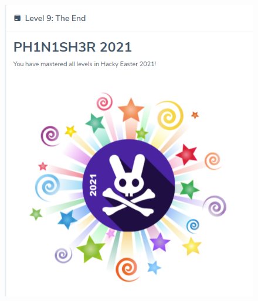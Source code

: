 \documentclass[english,a4paper,nols,noindent]{tufte-handout}
\begin{document}
\begin{figure}
    \includegraphics[width=150mm]{images/phinisher.png}
\end{figure}
\end{document}

